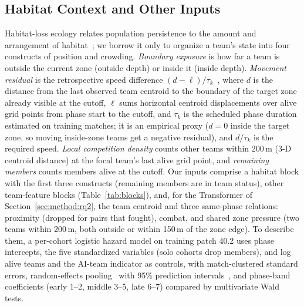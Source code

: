 \documentclass[sigconf,anonymous,nonacm]{acmart}
\begin{document}
\subsection{Habitat Context and Other Inputs}
\label{sec:method:representation}
Habitat-loss ecology relates population persistence to the amount and arrangement of habitat~\cite{Fahrig03}; we borrow it only to organize a team's state into four constructs of position and crowding.
\emph{Boundary exposure} is how far a team is outside the current zone (outside depth) or inside it (inside depth).
\emph{Movement residual} is the retrospective speed difference $(d-\ell)/\tau_k$~\cite{Nathan08}, where $d$ is the distance from the last observed team centroid to the boundary of the target zone already visible at the cutoff, $\ell$ sums horizontal centroid displacements over alive grid points from phase start to the cutoff, and $\tau_k$ is the scheduled phase duration estimated on training matches; it is an empirical proxy ($d=0$ inside the target zone, so moving inside-zone teams get a negative residual), and $d/\tau_k$ is the required speed.
\emph{Local competition density} counts other teams within 200\,m (3-D centroid distance) at the focal team's last alive grid point, and \emph{remaining members} counts members alive at the cutoff.
Our inputs comprise a habitat block with the first three constructs (remaining members are in team status), other team-feature blocks (Table~\ref{tab:blocks}), and, for the Transformer of Section~\ref{sec:method:rq2}, the team centroid and three same-phase relations: proximity (dropped for pairs that fought), combat, and shared zone pressure (two teams within 200\,m, both outside or within 150\,m of the zone edge).
To describe them, a per-cohort logistic hazard model on training patch 40.2 uses phase intercepts, the five standardized variables (solo cohorts drop members), and log alive teams and the AI-team indicator as controls, with match-clustered standard errors, random-effects pooling~\cite{DerSimonian86} with 95\% prediction intervals~\cite{Higgins09}, and phase-band coefficients (early 1--2, middle 3--5, late 6--7) compared by multivariate Wald tests.
\end{document}

